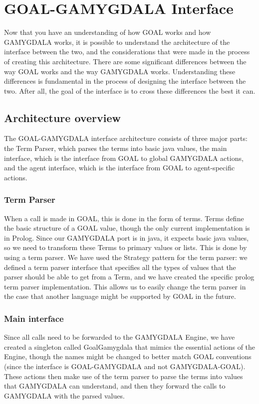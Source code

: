\section{GOAL-GAMYGDALA Interface}
Now that you have an understanding of how GOAL works and how GAMYGDALA works, it is possible to understand the architecture of the interface between the two, and the considerations that were made in the process of creating this architecture.
There are some significant differences between the way GOAL works and the way GAMYGDALA works. Understanding these differences is fundamental in the process of designing the interface between the two. After all, the goal of the interface is to cross these differences the best it can.

\subsection{Architecture overview}
The GOAL-GAMYGDALA interface architecture consists of three major parts: the Term Parser, which parses the terms into basic java values, the main interface, which is the interface from GOAL to global GAMYGDALA actions, and the agent interface, which is the interface from GOAL to agent-specific actions.

\subsubsection{Term Parser}
When a call is made in GOAL, this is done in the form of terms. Terms define the basic structure of a GOAL value, though the only current implementation is in Prolog. Since our GAMYGDALA port is in java, it expects basic java values, so we need to transform these Terms to primary values or lists. This is done by using a term parser.
We have used the Strategy pattern for the term parser: we defined a term parser interface that specifies all the types of values that the parser should be able to get from a Term, and we have created the specific prolog term parser implementation. This allows us to easily change the term parser in the case that another language might be supported by GOAL in the future.

\subsubsection{Main interface}
Since all calls need to be forwarded to the GAMYGDALA Engine, we have created a singleton called GoalGamygdala that mimics the essential actions of the Engine, though the names might be changed to better match GOAL conventions (since the interface is GOAL-GAMYGDALA and not GAMYGDALA-GOAL). These actions then make use of the term parser to parse the terms into values that GAMYGDALA can understand, and then they forward the calls to GAMYGDALA with the parsed values.

